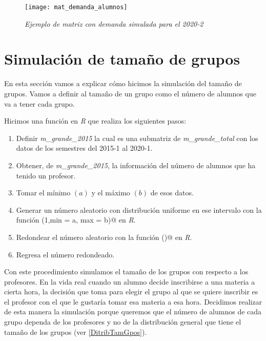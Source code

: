 \begin{figure}[H]
\centering
\texttt{[image: mat\_demanda\_alumnos]} %
\caption{\textit{Ejemplo de matriz con demanda simulada para el 2020-2}}\label{matDemandaAlum}
\end{figure}





\section{Simulación de tamaño de grupos}

En esta sección vamos a explicar cómo hicimos la simulación del tamaño de grupos. Vamos a definir al tamaño de un grupo como el número de alumnos que va a tener cada grupo.

Hicimos una función en \textit{R} que realiza los siguientes pasos:

\begin{enumerate}
\item Definir \textit{m\_grande\_2015} la cual es una submatriz de \textit{m\_grande\_total} con los datos de los semestres del 2015-1 al 2020-1.

\item Obtener, de \textit{m\_grande\_2015}, la información del número de alumnos que ha tenido un profesor.

\item Tomar el mínimo $(a)$ y el máximo $(b)$ de esos datos.

\item Generar un número aleatorio con distribución uniforme en ese intervalo con la función \verb@runif(1,min = a, max = b)@ en \textit{R}.

\item Redondear el número aleatorio con la función \verb@ceiling()@ en \textit{R}.

\item Regresa el número redondeado.
\end{enumerate}

Con este procedimiento simulamos el tamaño de los grupos con respecto a los profesores. En la vida real cuando un alumno decide inscribirse a una materia a cierta hora, la decisión que toma para elegir el grupo al que se quiere inscribir es el profesor con el que le gustaría tomar esa materia a esa hora. Decidimos realizar de esta manera la simulación porque queremos que el número de alumnos de cada grupo dependa de los profesores y no de la distribución general que tiene el tamaño de los grupos (ver \ref{DitribTamGpos}).




